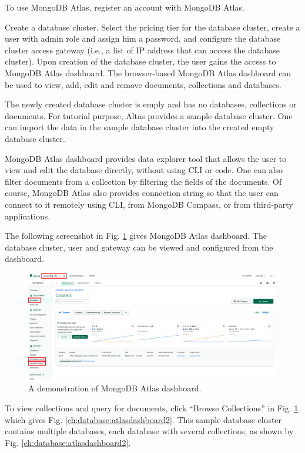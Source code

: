 To use MongoDB Atlas, register an account with MongoDB Atlas.

Create a database cluster. Select the pricing tier for the database cluster, create a user with admin role and assign him a password, and configure the database cluster access gateway (i.e., a list of IP address that can access the database cluster). Upon creation of the database cluster, the user gains the access to MongoDB Atlas dashboard. The browser-based MongoDB Atlas dashboard can be used to view, add, edit and remove documents, collections and databases.

The newly created database cluster is emply and has no databases, collections or documents. For tutorial purpose, Altas provides a sample database cluster. One can import the data in the sample database cluster into the created empty database cluster. 

MongoDB Atlas dashboard provides data explorer tool that allows the user to view and edit the database directly, without using CLI or code. One can also filter documents from a collection by filtering the fields of the documents. Of course, MongoDB Atlas also provides connection string so that the user can connect to it remotely using CLI, from MongoDB Compass, or from third-party applications.

The following screenshot in Fig. \ref{ch:database:atlasdashboard} gives MongoDB Atlas dashboard. The database cluster, user and gateway can be viewed and configured from the dashboard.

\begin{figure}[htbp]
	\centering
	\includegraphics[width=\textwidth]{chapters/part-3/figures/atlas_dashboard.png}
	\caption{A demonstration of MongoDB Atlas dashboard.} \label{ch:database:atlasdashboard}
\end{figure}

To view collections and query for documents, click ``Browse Collections'' in Fig. \ref{ch:database:atlasdashboard} which gives Fig. \ref{ch:database:atlasdashboard2}. This sample database cluster contains multiple databases, each database with several collections, as shown by Fig. \ref{ch:database:atlasdashboard2}.

